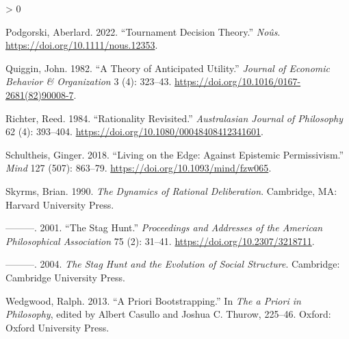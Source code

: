 \documentclass[
  12pt,
]{article}
\newlength{\cslhangindent}
\newenvironment{CSLReferences}[2] %
 {%
  \setlength{\parindent}{0pt}
  \ifodd #1 \everypar{\setlength{\hangindent}{\cslhangindent}}\ignorespaces\fi
  \ifnum #2 > 0
  \setlength{\parskip}{#2\baselineskip}
  \fi
 }%
 {}
\begin{document}
\begin{CSLReferences}{1}{0}
\leavevmode\hypertarget{ref-Podgorski2022}{}%
Podgorski, Aberlard. 2022. {``Tournament Decision Theory.''}
\emph{No{û}s}. \url{https://doi.org/10.1111/nous.12353}.

\leavevmode\hypertarget{ref-Quiggin1982}{}%
Quiggin, John. 1982. {``A Theory of Anticipated Utility.''}
\emph{Journal of Economic Behavior \& Organization} 3 (4): 323--43.
\url{https://doi.org/10.1016/0167-2681(82)90008-7}.

\leavevmode\hypertarget{ref-Richter1984}{}%
Richter, Reed. 1984. {``Rationality Revisited.''} \emph{Australasian
Journal of Philosophy} 62 (4): 393--404.
\url{https://doi.org/10.1080/00048408412341601}.

\leavevmode\hypertarget{ref-Schultheis2018}{}%
Schultheis, Ginger. 2018. {``Living on the Edge: Against Epistemic
Permissivism.''} \emph{Mind} 127 (507): 863--79.
\url{https://doi.org/10.1093/mind/fzw065}.

\leavevmode\hypertarget{ref-Skyrms1990}{}%
Skyrms, Brian. 1990. \emph{The Dynamics of Rational Deliberation}.
Cambridge, MA: Harvard University Press.

\leavevmode\hypertarget{ref-Skyrms2001}{}%
---------. 2001. {``The Stag Hunt.''} \emph{Proceedings and Addresses of
the American Philosophical Association} 75 (2): 31--41.
\url{https://doi.org/10.2307/3218711}.

\leavevmode\hypertarget{ref-Skyrms2004}{}%
---------. 2004. \emph{The Stag Hunt and the Evolution of Social
Structure}. Cambridge: {C}ambridge {U}niversity {P}ress.

\leavevmode\hypertarget{ref-Wedgwood2013}{}%
Wedgwood, Ralph. 2013. {``A Priori Bootstrapping.''} In \emph{The a
Priori in Philosophy}, edited by Albert Casullo and Joshua C. Thurow,
225--46. Oxford: Oxford University Press.

\end{CSLReferences}
\end{document}
